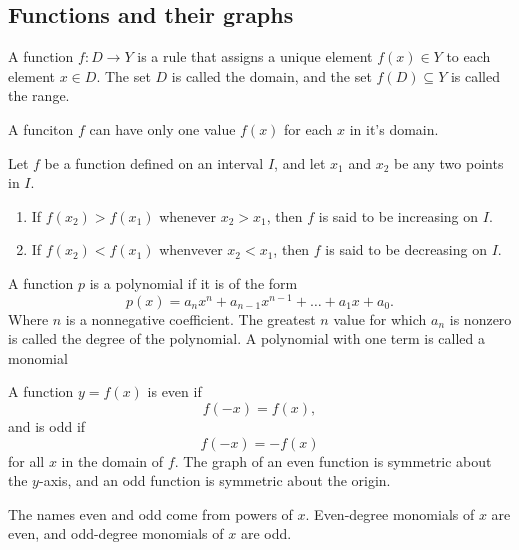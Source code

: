 \documentclass[oneside]{book}
\begin{document}
\subsection{Functions and their graphs}
\begin{definition}[Function]
	A function \(f:D\rightarrow Y\) is a rule that assigns a unique element \(f(x)\in Y\) to each element \(x\in D\). The set \(D\) is called the domain, and the set \(f(D)\subseteq Y\) is called the range.
\end{definition}
\begin{proposition}
	A funciton \(f\) can have only one value \(f(x)\) for each \(x\) in it's domain.
\end{proposition}
\begin{definition}
	Let \(f\) be a function defined on an interval \(I\), and let \(x_1\) and \(x_2\) be any two points in \(I\).
	\begin{enumerate}
		\item If \(f(x_2)>f(x_1)\) whenever \(x_2>x_1\), then \(f\) is said to be increasing on \(I\).
		\item  If \(f(x_2)<f(x_1)\) whenvever \(x_2<x_1\), then \(f\) is said to be decreasing on \(I\).
	\end{enumerate}
\end{definition}
\begin{definition}[Polynomial]
	A function \(p\) is a polynomial if it is of the form
	\begin{equation*}
		p(x)=a_nx^n+a_{n-1}x^{n-1}+\ldots+a_1x+a_0.
	\end{equation*}
	Where \(n\) is a nonnegative coefficient. The greatest \(n\) value for which \(a_n\) is nonzero is called the degree of the polynomial. A polynomial with one term is called a monomial
\end{definition}
\begin{definition}
	A function \(y=f(x)\) is even if
	\begin{equation*}
		f(-x)=f(x),
	\end{equation*}
	and is odd if
	\begin{equation*}
		f(-x)=-f(x)
	\end{equation*}
	for all \(x\) in the domain of \(f\). The graph of an even function is symmetric about the \(y\)-axis, and an odd function is symmetric about the origin.
\end{definition}
\begin{remark}
	The names even and odd come from powers of \(x\). Even-degree monomials of \(x\) are even, and odd-degree monomials of \(x\) are odd.
\end{remark}
\end{document}
